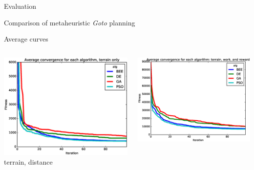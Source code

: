 \documentclass[9pt]{beamer}
\begin{document}
\begin{frame}{Evaluation}
    \begin{block}{Comparison of metaheuristic \textit{Goto} planning}
    \end{block}
    \begin{block}{Average curves}
        \begin{columns}
            \begin{column}{0.5\textwidth}
                \begin{center}
                    \includegraphics[width=\textwidth,trim={.75cm .75cm 0cm 1cm},clip]{img/conv_avg_a.eps}
                    \linebreak
                    terrain, distance
                \end{center}
            \end{column}
            \begin{column}{0.5\textwidth}
                \begin{center}
                    \includegraphics[width=\textwidth,trim={.75cm .75cm 0cm 1cm},clip]{img/conv_avg_b.eps}

\end{center}
\end{column}
\end{columns}
\end{block}
\end{frame}
\end{document}
